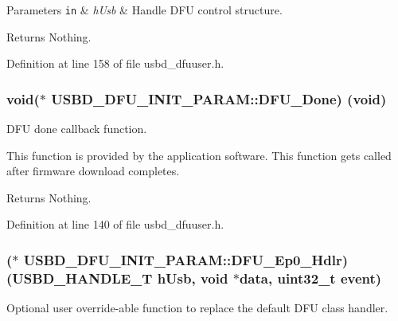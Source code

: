 \begin{DoxyParams}[1]{Parameters}
\mbox{\tt in}  & {\em h\+Usb} & Handle D\+FU control structure. \\
\hline
\end{DoxyParams}
\begin{DoxyReturn}{Returns}
Nothing. 
\end{DoxyReturn}


Definition at line 158 of file usbd\+\_\+dfuuser.\+h.

\subsubsection[{\texorpdfstring{D\+F\+U\+\_\+\+Done}{DFU_Done}}]{\setlength{\rightskip}{0pt plus 5cm}void($\ast$ U\+S\+B\+D\+\_\+\+D\+F\+U\+\_\+\+I\+N\+I\+T\+\_\+\+P\+A\+R\+A\+M\+::\+D\+F\+U\+\_\+\+Done) (void)}\hypertarget{structUSBD__DFU__INIT__PARAM_ace12153364bebed4b022776bcdf4574f}{}\label{structUSBD__DFU__INIT__PARAM_ace12153364bebed4b022776bcdf4574f}
D\+FU done callback function.

This function is provided by the application software. This function gets called after firmware download completes.

\begin{DoxyReturn}{Returns}
Nothing. 
\end{DoxyReturn}


Definition at line 140 of file usbd\+\_\+dfuuser.\+h.

\subsubsection[{\texorpdfstring{D\+F\+U\+\_\+\+Ep0\+\_\+\+Hdlr}{DFU_Ep0_Hdlr}}]{($\ast$ U\+S\+B\+D\+\_\+\+D\+F\+U\+\_\+\+I\+N\+I\+T\+\_\+\+P\+A\+R\+A\+M\+::\+D\+F\+U\+\_\+\+Ep0\+\_\+\+Hdlr) ({\bf U\+S\+B\+D\+\_\+\+H\+A\+N\+D\+L\+E\+\_\+T} h\+Usb, void $\ast$data, uint32\+\_\+t event)}\hypertarget{structUSBD__DFU__INIT__PARAM_a066ab927ae9d87ecac1113648ecb51c6}{}\label{structUSBD__DFU__INIT__PARAM_a066ab927ae9d87ecac1113648ecb51c6}
Optional user override-\/able function to replace the default D\+FU class handler.

